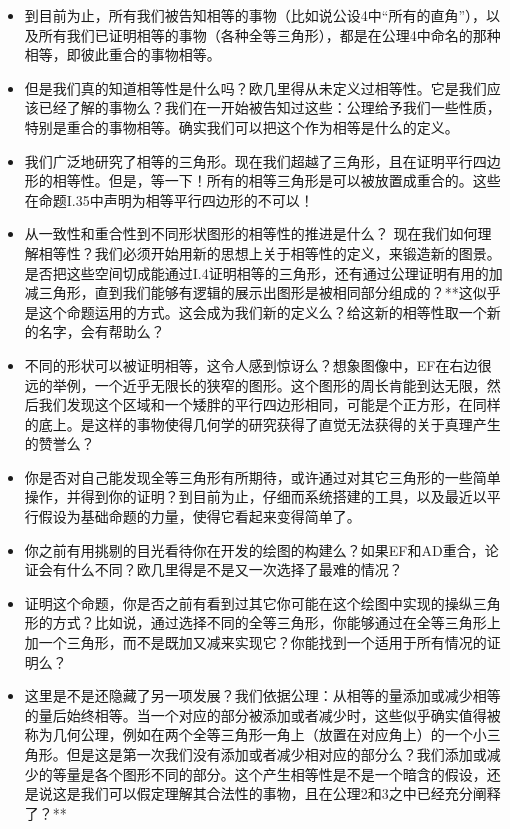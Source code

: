 \documentclass[
]{book}
\providecommand{\tightlist}{%
  \setlength{\itemsep}{0pt}\setlength{\parskip}{0pt}}
\begin{document}
\begin{itemize}
\tightlist
\item
  到目前为止，所有我们被告知相等的事物（比如说公设4中``所有的直角''），以及所有我们已证明相等的事物（各种全等三角形），都是在公理4中命名的那种相等，即彼此重合的事物相等。
\item
  但是我们真的知道相等性是什么吗？欧几里得从未定义过相等性。它是我们应该已经了解的事物么？我们在一开始被告知过这些：公理给予我们一些性质，特别是重合的事物相等。确实我们可以把这个作为相等是什么的定义。
\item
  我们广泛地研究了相等的三角形。现在我们超越了三角形，且在证明平行四边形的相等性。但是，等一下！所有的相等三角形是可以被放置成重合的。这些在命题I.35中声明为相等平行四边形的不可以！
\item
  从一致性和重合性到不同形状图形的相等性的推进是什么？
  现在我们如何理解相等性？我们必须开始用新的思想上关于相等性的定义，来锻造新的图景。是否把这些空间切成能通过I.4证明相等的三角形，还有通过公理证明有用的加减三角形，直到我们能够有逻辑的展示出图形是被相同部分组成的？**这似乎是这个命题运用的方式。这会成为我们新的定义么？给这新的相等性取一个新的名字，会有帮助么？
\item
  不同的形状可以被证明相等，这令人感到惊讶么？想象图像中，EF在右边很远的举例，一个近乎无限长的狭窄的图形。这个图形的周长肯能到达无限，然后我们发现这个区域和一个矮胖的平行四边形相同，可能是个正方形，在同样的底上。是这样的事物使得几何学的研究获得了直觉无法获得的关于真理产生的赞誉么？
\item
  你是否对自己能发现全等三角形有所期待，或许通过对其它三角形的一些简单操作，并得到你的证明？到目前为止，仔细而系统搭建的工具，以及最近以平行假设为基础命题的力量，使得它看起来变得简单了。
\item
  你之前有用挑剔的目光看待你在开发的绘图的构建么？如果EF和AD重合，论证会有什么不同？欧几里得是不是又一次选择了最难的情况？
\item
  证明这个命题，你是否之前有看到过其它你可能在这个绘图中实现的操纵三角形的方式？比如说，通过选择不同的全等三角形，你能够通过在全等三角形上加一个三角形，而不是既加又减来实现它？你能找到一个适用于所有情况的证明么？
\item
  这里是不是还隐藏了另一项发展？我们依据公理：从相等的量添加或减少相等的量后始终相等。当一个对应的部分被添加或者减少时，这些似乎确实值得被称为几何公理，例如在两个全等三角形一角上（放置在对应角上）的一个小三角形。但是这是第一次我们没有添加或者减少相对应的部分么？我们添加或减少的等量是各个图形不同的部分。这个产生相等性是不是一个暗含的假设，还是说这是我们可以假定理解其合法性的事物，且在公理2和3之中已经充分阐释了？**
\end{itemize}
\end{document}
